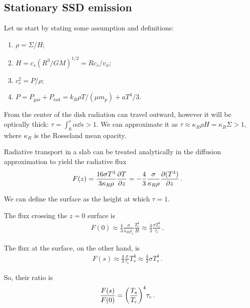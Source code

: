 \documentclass[main.tex]{subfiles}
\begin{document}
\subsection{Stationary SSD emission}


Let us start by stating some assumption and definitions:
%
\begin{enumerate}
    \item \(\rho = \Sigma / H\);
    \item \(H = c_s (R^3 / GM)^{1/2} = R c_s / v_\phi \);
    \item \(c_s^2 = P / \rho \);
    \item \(P = P _{\text{gas}} + P _{\text{rad}} = k_B \rho T / (\mu m_p) + a T^{4} / 3\).
\end{enumerate}

From the center of the disk radiation can travel outward, however it will be optically thick: \(\tau = \int_{0}^{r} \alpha \dd{s} >1\).
We can approximate it as \(\tau \approx \kappa _R \rho H = \kappa _R \Sigma > 1\), where \(\kappa _R\) is the Rosseland mean opacity.

Radiative transport in a slab can be treated analytically in the diffusion approximation to yield the radiative flux 
%
\begin{align}
F(z) = \frac{16 \sigma T^3}{3 \kappa _R \rho } \pdv{T}{z} = - \frac{4}{3} \frac{\sigma}{\kappa _R \rho } \pdv{(T^{4})}{z}
\,.
\end{align}

We can define the surface as the height at which \(\tau =1\).

The flux crossing the \(z = 0\) surface is 
%
\begin{align}
F(0) \approx \frac{4}{3} \frac{\sigma }{\kappa _R \rho _c} \frac{T_c^{4}}{H} \approx \frac{4}{3} \frac{\sigma T_c^{4}}{\tau _c}
\,.
\end{align}


The flux at the surface, on the other hand, is
%
\begin{align}
F(s) \approx \frac{4}{3} \frac{\sigma}{\tau _s} T_s^{4} \approx \frac{4}{3} \sigma T_s^{4}
\,.
\end{align}

So, their ratio is 
%
\begin{align}
\frac{F(s)}{F(0)} = \qty(\frac{T_s}{T_c})^{4} \tau _c 
\,.
\end{align}
\end{document}
